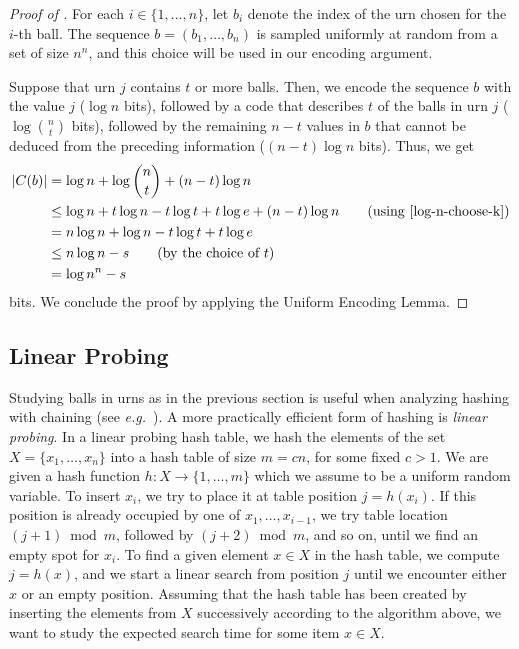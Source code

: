 \documentclass[format=acmsmall, review=false, screen=true]{acmart}
\begin{document}
\begin{proof}[Proof of ]
  For each $i\in\{1,\ldots,n\}$, let $b_i$ denote the index of the urn
  chosen for the $i$-th ball. The sequence $b = (b_1,\ldots,b_n)$ is
  sampled uniformly at random from a set of size $n^n$, and this
  choice will be used in our encoding argument.

  Suppose that urn $j$ contains $t$ or more balls. Then,
  we encode the sequence $b$
  with the value $j$ ($\log n$ bits), followed by a code that describes $t$ of
  the balls in urn $j$ ($\log\binom{n}{t}$ bits), followed by the remaining $n-t$ values in
  $b$ that cannot be deduced from the preceding
  information ($(n-t)\log n$ bits).  Thus, we get
  \begin{align*}
    |C(b)| &= \log n + \log\binom{n}{t} + (n-t)\log n \\
           &\le \log n + t\log n - t\log t + t\log e + (n-t)\log n
             \tag{using \eqref{log-n-choose-k}} \\
           & = n \log n + \log n - t\log t + t\log e \\
           & \le n \log n - s \tag{by the choice of $t$} \\
           & = \log n^n - s
  \end{align*}
  bits. We conclude the proof by applying the Uniform Encoding Lemma.
\end{proof}

\subsection{Linear Probing}

Studying balls in urns as in the previous section is useful when 
analyzing hashing with chaining
(see \emph{e.g.}~). A more practically
efficient form of hashing is \emph{linear probing}.  In a linear
probing hash table, we hash the elements of the set
$X = \{x_1, \ldots, x_n\}$ into a hash table of size $m=cn$, for some
fixed $c> 1$. We are given a hash function
$h : X \to \{1, \ldots, m\}$ which we assume to be a uniform random
variable. To insert $x_i$, we try to place it at table position
$j=h(x_i)$. If this position is already occupied by one of
$x_1,\ldots,x_{i-1}$, we try table location
$(j+1)\bmod m$, followed by $(j+2)\bmod m$, and so on, until 
we find an empty spot
for $x_i$.  
To find a given element $x \in X$ in the hash table, we compute
$j = h(x)$, and we start a linear search from position $j$ 
until we encounter either $x$ or an empty position.
Assuming that the hash table has been created by inserting
the elements from $X$ successively according to the
algorithm above, 
we want to study the expected search time for some item
$x \in X$.
\end{document}
